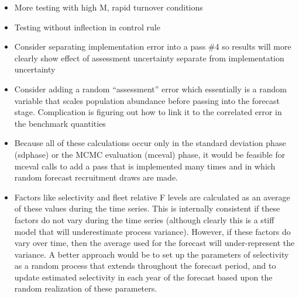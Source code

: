\begin{itemize}
	\item More testing with high M, rapid turnover conditions
	\item Testing without inflection in control rule
	\item Consider separating implementation error into a pass \#4 so results will more clearly show effect of assessment uncertainty separate from implementation uncertainty
	\item Consider adding a random ``assessment'' error which essentially is a random variable that scales population abundance before passing into the forecast stage. Complication is figuring out how to link it to the correlated error in the benchmark quantities
	\item Because all of these calculations occur only in the standard deviation phase (sdphase) or the MCMC evaluation (mceval) phase, it would be feasible for mceval calls to add a pass that is implemented many times and in which random forecast recruitment draws are made.
	\item Factors like selectivity and fleet relative F levels are calculated as an average of these values during the time series. This is internally consistent if these factors do not vary during the time series (although clearly this is a stiff model that will underestimate process variance). However, if these factors do vary over time, then the average used for the forecast will under-represent the variance. A better approach would be to set up the parameters of selectivity as a random process that extends throughout the forecast period, and to update estimated selectivity in each year of the forecast based upon the random realization of these parameters.
\end{itemize}

	
